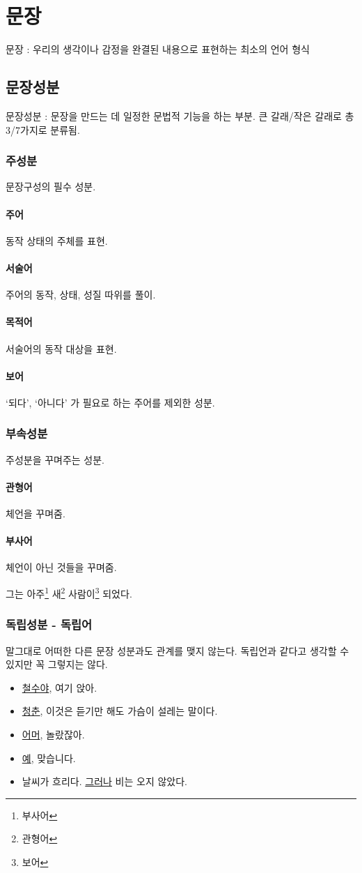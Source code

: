 \documentclass[10pt]{report}
\begin{document}
\chapter{문장}
문장 : 우리의 생각이나 감정을 완결된 내용으로 표현하는 최소의 언어 형식
\section{문장성분}
문장성분 : 문장을 만드는 데 일정한 문법적 기능을 하는 부분. 큰 갈래/작은 갈래로 총 3/7가지로 분류됨.
\subsection{주성분}
문장구성의 필수 성분.
\subsubsection{주어}
동작 상태의 주체를 표현.
\subsubsection{서술어}
주어의 동작, 상태, 성질 따위를 풀이.
\subsubsection{목적어}
서술어의 동작 대상을 표현.
\subsubsection{보어}
`되다', `아니다' 가 필요로 하는 주어를 제외한 성분.
\subsection{부속성분}
주성분을 꾸며주는 성분.
\subsubsection{관형어}
체언을 꾸며줌.
\subsubsection{부사어}
체언이 아닌 것들을 꾸며줌.
\begin{center}
	그는 아주\footnote{부사어} 새\footnote{관형어} 사람이\footnote{보어} 되었다.
\end{center}
\subsection{독립성분 - 독립어}
말그대로 어떠한 다른 문장 성분과도 관계를 맺지 않는다. 독립언과 같다고 생각할 수 있지만 꼭 그렇지는 않다.
\begin{itemize}
\item \underline{철수야}, 여기 앉아.
\item \underline{청춘}, 이것은 듣기만 해도 가슴이 설레는 말이다.
\item \underline{어머}, 놀랐잖아.
\item \underline{예}, 맞습니다.
\item 날씨가 흐리다. \underline{그러나} 비는 오지 않았다.
\end{itemize}
\end{document}
